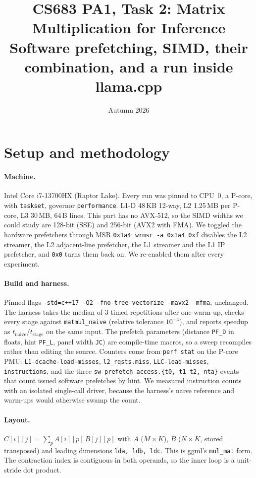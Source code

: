 \documentclass[11pt,a4paper]{article}
\title{\textbf{CS683 PA1, Task 2: Matrix Multiplication for Inference}\\[4pt]
\large Software prefetching, SIMD, their combination, and a run inside llama.cpp}
\author{\teamtable}
\date{Autumn 2026}
\begin{document}
\maketitle

\section{Setup and methodology}

\paragraph{Machine.} Intel Core i7-13700HX (Raptor Lake). Every run was pinned to CPU~0, a P-core, with \texttt{taskset}, governor \texttt{performance}. L1-D 48\,KB 12-way, L2 1.25\,MB per P-core, L3 30\,MB, 64\,B lines. This part has no AVX-512, so the SIMD widths we could study are 128-bit (SSE) and 256-bit (AVX2 with FMA). We toggled the hardware prefetchers through MSR \texttt{0x1a4}: \texttt{wrmsr -a 0x1a4 0xf} disables the L2 streamer, the L2 adjacent-line prefetcher, the L1 streamer and the L1 IP prefetcher, and \texttt{0x0} turns them back on. We re-enabled them after every experiment.

\paragraph{Build and harness.} Pinned flags \texttt{-std=c++17 -O2 -fno-tree-vectorize -mavx2 -mfma}, unchanged. The harness takes the median of 3 timed repetitions after one warm-up, checks every stage against \texttt{matmul\_naive} (relative tolerance $10^{-4}$), and reports speedup as $t_{\text{naive}}/t_{\text{stage}}$ on the same input. The prefetch parameters (distance \texttt{PF\_D} in floats, hint \texttt{PF\_L}, panel width \texttt{JC}) are compile-time macros, so a sweep recompiles rather than editing the source. Counters come from \texttt{perf stat} on the P-core PMU: \texttt{L1-dcache-load-misses}, \texttt{l2\_rqsts.miss}, \texttt{LLC-load-misses}, \texttt{instructions}, and the three \texttt{sw\_prefetch\_access.\{t0, t1\_t2, nta\}} events that count issued software prefetches by hint. We measured instruction counts with an isolated single-call driver, because the harness's naive reference and warm-ups would otherwise swamp the count.

\paragraph{Layout.} $C[i][j] = \sum_p A[i][p]\,B[j][p]$ with $A$ ($M\times K$), $B$ ($N\times K$, stored transposed) and leading dimensions \texttt{lda, ldb, ldc}. This is ggml's \texttt{mul\_mat} form. The contraction index is contiguous in both operands, so the inner loop is a unit-stride dot product.
\end{document}
